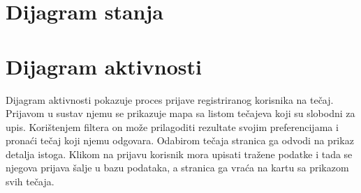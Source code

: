 					
		\eject
		
		\section{Dijagram stanja}
			
			
			
			
			
		
		\section{Dijagram aktivnosti}

            \noindent Dijagram aktivnosti pokazuje proces prijave registriranog korisnika na tečaj. Prijavom u sustav njemu se prikazuje mapa sa listom tečajeva koji su slobodni za upis. Korištenjem filtera on može prilagoditi rezultate svojim preferencijama i pronaći tečaj koji njemu odgovara. Odabirom tečaja stranica ga odvodi na prikaz detalja istoga. Klikom na prijavu korisnik mora upisati tražene podatke i tada se njegova prijava šalje u bazu podataka, a stranica ga vraća na kartu sa prikazom svih tečaja. 

